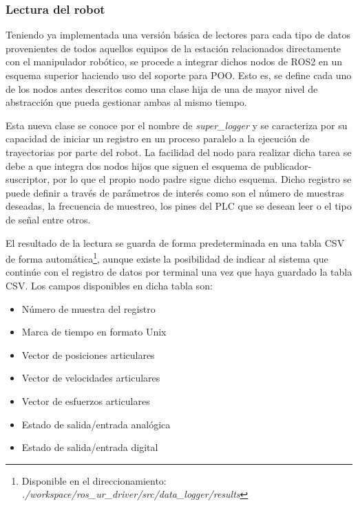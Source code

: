 \subsubsection*{Lectura del robot}
\hypertarget{Lectura del robot}{}

Teniendo ya implementada una versión básica de lectores para cada tipo de datos provenientes de todos aquellos equipos de la estación relacionados directamente con el manipulador robótico, se procede a integrar dichos nodos de ROS2 en un esquema superior haciendo uso del soporte para \acrshort{POO}. Esto es, se define cada uno de los nodos antes descritos como una clase hija de una de mayor nivel de abstracción que pueda gestionar ambas al mismo tiempo. 

Esta nueva clase se conoce por el nombre de \textit{super\_logger} y se caracteriza por su capacidad de iniciar un registro en un proceso paralelo a la ejecución de trayectorias por parte del robot. La facilidad del nodo para realizar dicha tarea se debe a que integra dos nodos hijos que siguen el esquema de publicador-suscriptor, por lo que el propio nodo padre sigue dicho esquema. Dicho registro se puede definir a través de parámetros de interés como son el número de muestras deseadas, la frecuencia de muestreo, los pines del \acrshort{PLC} que se desean leer o el tipo de señal entre otros. 

El resultado de la lectura se guarda de forma predeterminada en una tabla CSV de forma automática\footnote{Disponible en el direccionamiento: \textit{./workspace/ros\_ur\_driver/src/data\_logger/results}}, aunque existe la posibilidad de indicar al sistema que continúe con el registro de datos por terminal una vez que haya guardado la tabla CSV. Los campos disponibles en dicha tabla son:

\begin{itemize}
    \item Número de muestra del registro
    \item Marca de tiempo en formato Unix
    \item Vector de posiciones articulares
    \item Vector de velocidades articulares
    \item Vector de esfuerzos articulares
    \item Estado de salida/entrada analógica
    \item Estado de salida/entrada digital
\end{itemize}

